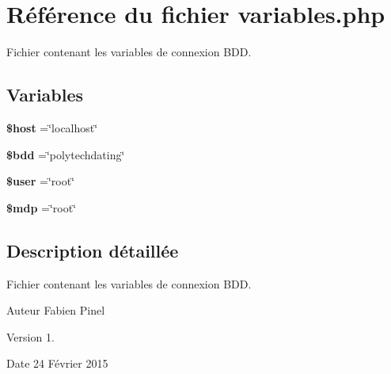 \hypertarget{variables_8php}{\section{Référence du fichier variables.\-php}
\label{variables_8php}
}


Fichier contenant les variables de connexion B\-D\-D.  


\subsection*{Variables}
\begin{DoxyCompactItemize}
\item 
\hypertarget{variables_8php_a711797613cb863ca0756df789c396bf2}{{\bfseries \$host} =\char`\"{}localhost\char`\"{}}\label{variables_8php_a711797613cb863ca0756df789c396bf2}

\item 
\hypertarget{variables_8php_a94f91e878bce0991e2cd595c5dd79b3f}{{\bfseries \$bdd} =\char`\"{}polytechdating\char`\"{}}\label{variables_8php_a94f91e878bce0991e2cd595c5dd79b3f}

\item 
\hypertarget{variables_8php_a598ca4e71b15a1313ec95f0df1027ca5}{{\bfseries \$user} =\char`\"{}root\char`\"{}}\label{variables_8php_a598ca4e71b15a1313ec95f0df1027ca5}

\item 
\hypertarget{variables_8php_a8a65334de2f0d486a42b02ecf82fe8fb}{{\bfseries \$mdp} =\char`\"{}root\char`\"{}}\label{variables_8php_a8a65334de2f0d486a42b02ecf82fe8fb}

\end{DoxyCompactItemize}


\subsection{Description détaillée}
Fichier contenant les variables de connexion B\-D\-D. \begin{DoxyAuthor}{Auteur}
Fabien Pinel 
\end{DoxyAuthor}
\begin{DoxyVersion}{Version}
1. 
\end{DoxyVersion}
\begin{DoxyDate}{Date}
24 Février 2015 
\end{DoxyDate}
